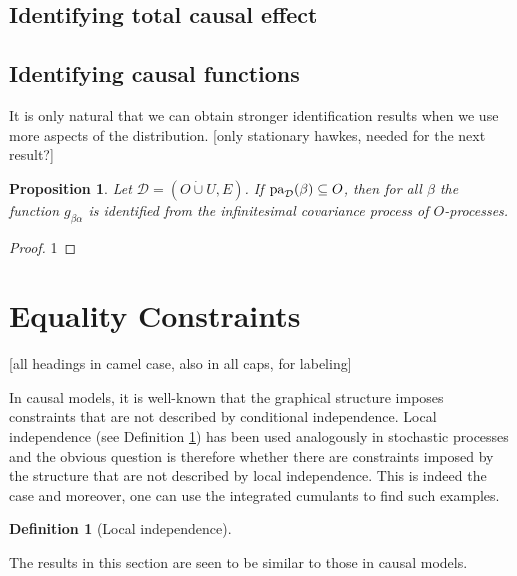 \documentclass[accepted]{uai2021} %
\newtheorem{defn}[thm]{Definition}
\newtheorem{prop}[thm]{Proposition}
\newcommand{\pa}{\textnormal{pa}}
\newcommand{\disjU}{\mathbin{\dot{\cup}}}
\begin{document}

\subsection{Identifying total causal effect}




\subsection{Identifying causal functions}

It is only natural that we can obtain stronger identification results when we 
use more aspects of the distribution. [only stationary hawkes, needed for the 
next result?]

\begin{prop}
	Let $\mathcal{D} = (O\disjU U, E)$. If $\pa_\mathcal{D}(\beta) \subseteq 
	O$, then for all $\beta$ the function $g_{\beta\alpha}$ is identified from 
	the infinitesimal covariance process of $O$-processes.
	\label{prop:gPaId}
\end{prop}



\begin{proof}
	1
\end{proof}


\section{Equality Constraints}

[all headings in camel case, also in all caps, for labeling]

In causal models, it is well-known that the graphical structure imposes 
constraints that 
are not described by conditional independence. Local independence (see 
Definition \ref{def:li}) has been used analogously in stochastic processes and 
the obvious question is therefore whether there are constraints imposed by the 
structure that are not described by local independence. This is indeed the case 
and moreover, one can use the integrated cumulants to find such examples.

\begin{defn}[Local independence]
	\label{def:li}
\end{defn}

The results in this section are seen to be similar to those in causal models.
\end{document}
